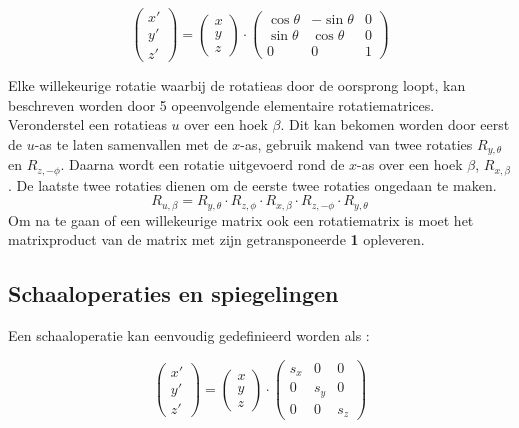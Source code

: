 \documentclass{report}
\begin{document}
\begin{itemize}
					\[
						\begin{pmatrix}
						x' \\
						y' \\
						z'
						\end{pmatrix}
						=
						\begin{pmatrix}
						x \\
						y \\
						z
						\end{pmatrix}
						\cdot
						\begin{pmatrix}
						\cos \theta & - \sin \theta & 0  \\
						\sin \theta & \cos \theta & 0 \\
						0 & 0 & 1
						\end{pmatrix}
					\]
	\end{itemize}
	Elke willekeurige rotatie waarbij de rotatieas door de oorsprong loopt, kan beschreven worden door 5 opeenvolgende elementaire rotatiematrices. Veronderstel een rotatieas $u$ over een hoek $\beta$. Dit kan bekomen worden door eerst de $u$-as te laten samenvallen met de $x$-as, gebruik makend van twee rotaties $R_{y,\theta}$ en $R_{z, -\phi}$. Daarna wordt een rotatie uitgevoerd rond de $x$-as over een hoek $\beta$, $R_{x,\beta}$. De laatste twee rotaties dienen om de eerste twee rotaties ongedaan te maken.
	$$R_{u, \beta} = R_{y, \theta} \cdot R_{z, \phi} \cdot R_{x, \beta} \cdot R_{z, -\phi} \cdot R_{y,\theta}$$
	Om na te gaan of een willekeurige matrix ook een rotatiematrix is moet het matrixproduct van de matrix met zijn getransponeerde \textbf{1} opleveren.
	\subsection{Schaaloperaties en spiegelingen}
	Een schaaloperatie kan eenvoudig gedefinieerd worden als :

	$$
		\begin{pmatrix}
			x' \\
			y' \\
			z'
		\end{pmatrix}
		= 
		\begin{pmatrix}
			x \\
			y \\
			z
		\end{pmatrix}
		\cdot
		\begin{pmatrix}
			s_x & 0 & 0 \\
			0 & s_y & 0 \\
			0 & 0  & s_z
		\end{pmatrix}
	$$
\end{document}
